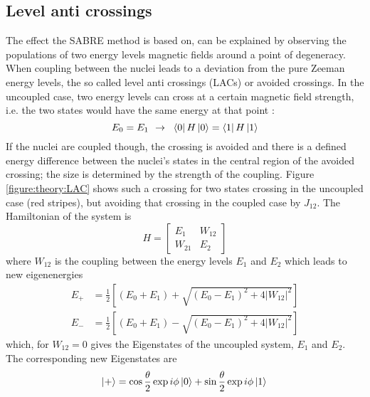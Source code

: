         \subsection{Level anti crossings}
        \label{sec:theory:LAC}
        The effect the SABRE method is based on, can be explained by observing the populations of two energy levels magnetic fields around a point of degeneracy. When coupling between the nuclei leads to a deviation from the pure Zeeman energy levels, the so called level anti crossings (LACs) or avoided crossings. In the uncoupled case, two energy levels  can cross at a certain magnetic field strength, i.e. the two states would have the same energy at that point \cite{ivanov_role_2014-2,pravdivtsev_spin_2014}:
        \begin{equation}
            E_0 = E_1 \mathrm{~~\rightarrow~~} \bra{0}H\ket{0} = \bra{1}H\ket{1}
        \end{equation}
        If the nuclei are coupled though, the crossing is avoided and there is a defined energy difference between the nuclei's states in the central region of the avoided crossing; the size is determined by the strength of the coupling. Figure \ref{figure:theory:LAC} shows such a crossing for two states crossing in the uncoupled case (red stripes), but avoiding that crossing in the coupled case by $J_{12}$. The Hamiltonian of the system is
        \begin{equation}
            H = \left [
                \begin{array}{ll}
                    E_{1} & W_{12}\\
                    W_{21} & E_2
                \end{array}
            \right ]
        \end{equation} 
        where $W_{12}$ is the coupling between the energy levels $E_1$ and $E_2$ which leads to new eigenenergies
        \begin{align*}
            E_+ &= \frac{1}{2} \left[(E_0+ E_1) + \sqrt{(E_0-E_1)^2+4|W_{12}|^2}\right]\\
            E_- &= \frac{1}{2} \left[(E_0+ E_1) - \sqrt{(E_0-E_1)^2+4|W_{12}|^2}\right]
        \end{align*}
        which, for $W_{12}=0$ gives the Eigenstates of the uncoupled system, $E_1$ and $E_2$. The corresponding new Eigenstates are 
        \begin{equation*}
            \ket{+} = \cos\frac{{\theta}}{2}\exp{i\phi}\ket{0} + \sin{\frac{\theta}{2}}\exp{i\phi}\ket{1}\\
        \end{equation*}
